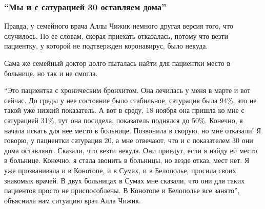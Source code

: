  
 
 

\subsubsection{\enquote{Мы и с сатурацией 30 оставляем дома}}
\label{sec:23_11_2020.news.ua.1.death_sumy_pcr_test_63_starushka.saturacija}

Правда, у семейного врача Аллы Чижик немного другая версия того, что случилось. По ее словам, скорая приехать отказалась, потому что везти пациентку, у которой не подтвержден коронавирус, было некуда.

Сама же семейный доктор долго пыталась найти для пациентки место в больнице, но так и не смогла.

\enquote{Это пациентка с хроническим бронхитом. Она лечилась у меня в марте и вот
сейчас. До среды у нее состояние было стабильное, сатурация была 94\%, это не
такой уже низкий показатель. А вот в среду, 18 ноября она пришла ко мне с
сатурацией 31\%, тут она посидела, показатель поднялся до 50\%. Конечно, я
начала искать для нее место в больнице. Позвонила в скорую, но мне отказали! Я
говорю, у пациентки сатурация 20, а мне отвечают, что и с показателем 30 они
дома оставляют. Сказали, что везти некуда. Они приедут, если я найду ей место в
больнице. Конечно, я стала звонить в больницы, но везде отказ, мест нет. Я уже
прозванивала и в Конотопе, и в Сумах, и в Белополье, просила своих знакомых
врачей. В двух больницах в Сумах мне сказали, что они для таких пациентов
просто не приспособлены. В Конотопе и Белополье \dshM все занято}, \dshM объяснила нам
ситуацию врач Алла Чижик.
